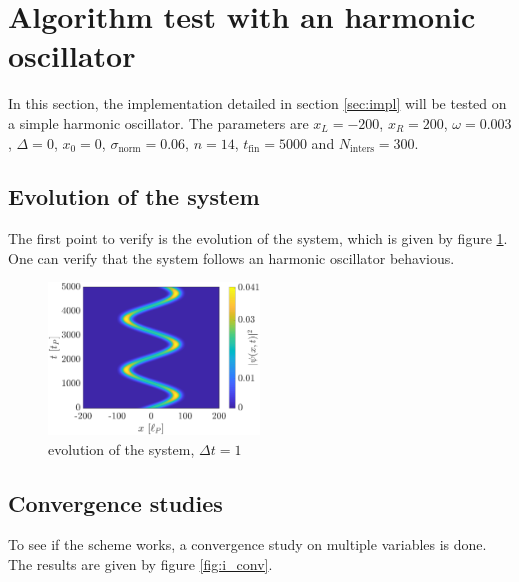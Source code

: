 \documentclass[a4paper,12pt,twoside]{article}
\begin{document}


\newpage
\section{Algorithm test with an harmonic oscillator}\label{sec:har_osc}
  In this section, the implementation detailed in section \ref{sec:impl} will be tested on a simple harmonic oscillator.
  The parameters are $x_L=\num{-200}$, $x_R=\num{200}$, $\omega = \num{0.003}$, $\Delta = 0$, $x_0 = 0$, $\sigma_\text{norm} = 0.06$, $n=14$, $t_\text{fin} = 5000$ and $N_\text{inters} = 300$. %


  \subsection{Evolution of the system}
  The first point to verify is the evolution of the system, which is given by figure \ref{fig:i_evo}.
  One can verify that the system follows an harmonic oscillator behavious.

  \begin{figure}[h]
    \centering
    \includegraphics[width=0.5\textwidth]{graphs/i_evo.eps}
    \caption{evolution of the system, $\Delta t = 1$}
    \label{fig:i_evo}
  \end{figure}

  \subsection{Convergence studies}
    To see if the scheme works, a convergence study on multiple variables is done.
    The results are given by figure \ref{fig:i_conv}.
\end{document}
